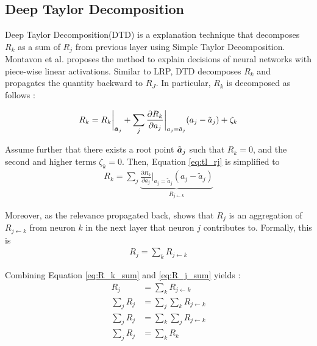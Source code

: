 \subsection{Deep Taylor Decomposition}
Deep Taylor Decomposition(DTD) is a explanation technique that decomposes $R_k$ as a sum of $R_j$ from previous layer using Simple Taylor Decomposition. Montavon et al.\cite{MontavonExplainingnonlinearclassification2017} proposes the method to explain decisions of neural networks with piece-wise linear activations. Similar to LRP, DTD decomposes $R_k$ and propagates the quantity backward to $R_J$. In particular, $R_k$ is decomposed as follows :




 \begin{align} \label{eq:tl_rj}
 R_k = R_k \bigg|_{ \tilde{\patvector{a}}_j } + \sum_{ j } 	\frac{\partial  R_k }{ \partial a_j } \bigg|_{ a_j = \tilde{a}_j } ( a_j - \tilde{a}_j ) + \zeta_k
 \end{align}

Assume further that there exists a root point $\tilde{\patvector{a}}_j$ such that $R_k = 0$, and the second and higher terms $\zeta_k = 0 $. Then, Equation \ref{eq:tl_rj} is simplified to
\begin{align} \label{eq:R_k_sum}
 R_k = \sum_{ j } \underbrace{	\frac{\partial  R_k }{ \partial a_j } \bigg|_{ a_j = \tilde{a}_j }  ( a_j - \tilde{a}_j ) }_{ R_{j \leftarrow k } }
\end{align}

Moreover, as the relevance propagated back, \cite{MontavonExplainingnonlinearclassification2017} shows that $R_j$ is an aggregation of $R_{j\leftarrow k}$ from neuron $k$ in the next layer that neuron $j$ contributes to. Formally, this is
\begin{align} \label{eq:R_j_sum}
	R_j = \sum_{k} R_{j\leftarrow k}
\end{align}

Combining Equation \ref{eq:R_k_sum} and \ref{eq:R_j_sum} yields :
\begin{align} \label{eq:rj_equal_rk}
	R_j &= \sum_{k} R_{j\leftarrow k} \nonumber \\
\sum_{j}	R_j &= \sum_{j} \sum_{k} R_{j\leftarrow k}\nonumber\\
\sum_{j}	R_j &= \sum_{k} \sum_{j} R_{j\leftarrow k} \nonumber\\
\sum_{j}	R_j &= \sum_{k}  R_{k}
\end{align}

